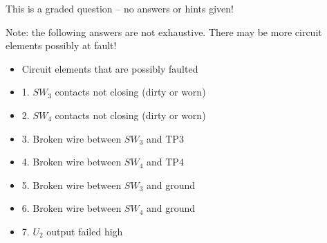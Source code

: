 \vfil 

\eject






This is a graded question -- no answers or hints given!







Note: the following answers are not exhaustive.  There may be more circuit elements possibly at fault!

\begin{itemize}
\item{} Circuit elements that are possibly faulted
\item{1.} $SW_3$ contacts not closing (dirty or worn)
\item{2.} $SW_4$ contacts not closing (dirty or worn)
\item{3.} Broken wire between $SW_3$ and TP3
\item{4.} Broken wire between $SW_4$ and TP4
\item{5.} Broken wire between $SW_3$ and ground
\item{6.} Broken wire between $SW_4$ and ground
\item{7.} $U_2$ output failed high
\end{itemize}





